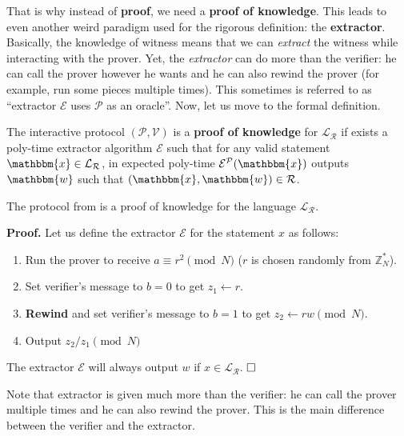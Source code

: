 \documentclass[../lecture-notes-148x210.tex]{subfiles}
\begin{document}
That is why instead of \textbf{proof}, we need a \textbf{proof of knowledge}.
This leads to even another weird paradigm used for the rigorous definition: the
\textbf{extractor}. Basically, the knowledge of witness means that we can
\textit{extract} the witness while interacting with the prover. Yet, the
\textit{extractor} can do more than the verifier: he can call the prover however
he wants and he can also rewind the prover (for example, run some pieces
multiple times). This sometimes is referred to as ``extractor $\mathcal{E}$ uses
$\mathcal{P}$ as an oracle''. Now, let us move to the formal definition.

\begin{definition}
    The interactive protocol $(\mathcal{P}, \mathcal{V})$ is a \textbf{proof of
    knowledge} for $\mathcal{L}_{\mathcal{R}}$ if exists a poly-time extractor
    algorithm $\mathcal{E}$ such that for any valid statement $\mathbbm{x} \in
    \mathcal{L}_{\mathcal{R}}$, in expected poly-time
    $\mathcal{E}^{\mathcal{P}}(\mathbbm{x})$ outputs $\mathbbm{w}$ such that
    $(\mathbbm{x},\mathbbm{w}) \in \mathcal{R}$.
\end{definition}

\begin{lemma}
    The protocol from  is a proof of
    knowledge for the language $\mathcal{L}_{\mathcal{R}}$. 
\end{lemma}

\textbf{Proof.} Let us define the extractor $\mathcal{E}$ for the statement $x$ as follows:
\begin{enumerate}
    \item Run the prover to receive $a \equiv r^2 \pmod{N}$ ($r$ is chosen randomly from $\mathbb{Z}_N^*$).
    \item Set verifier's message to $b=0$ to get $z_1 \gets r$.
    \item \textbf{Rewind} and set verifier's message to $b=1$ to get $z_2 \gets rw \pmod{N}$.
    \item Output $z_2/z_1 \pmod{N}$
\end{enumerate}

The extractor $\mathcal{E}$ will always output $w$ if $x \in
\mathcal{L}_{\mathcal{R}}$. $\hfill\Box$

\begin{remark}
    Note that extractor is given much more than the verifier: he can call the
    prover multiple times and he can also rewind the prover. This is the main
    difference between the verifier and the extractor.    
\end{remark}
\end{document}
